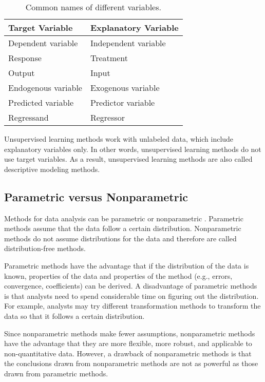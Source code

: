 \documentclass[12pt]{article}
\begin{document}
\begin{table}[htb]
\centering
\begin{tabular}{ll}
\toprule
\textbf{Target Variable}  &  \textbf{Explanatory Variable}\\
\midrule
Dependent variable & Independent variable\\
Response & Treatment \\
Output & Input \\
Endogenous variable & Exogenous variable \\
Predicted variable & Predictor variable \\
Regressand & Regressor \\
\bottomrule
\end{tabular}
\caption{Common names of different variables.}\label{tbl:lmnames}
\end{table}


Unsupervised learning methods work with unlabeled data, which include explanatory variables only. In other words, unsupervised learning methods do not use target variables. As a result, unsupervised learning methods are also called descriptive modeling methods.

\subsection{Parametric versus Nonparametric}

Methods for data analysis can be parametric or nonparametric \citep{abbott2014}. Parametric methods assume that the data follow a certain distribution. Nonparametric methods do not assume distributions for the data and therefore are called distribution-free methods.

Parametric methods have the advantage that if the distribution of the data is known, properties of the data and properties of the method (e.g., errors, convergence, coefficients) can be derived. A disadvantage of parametric methods is that analysts need to spend considerable time on figuring out the distribution. For example, analysts may try different transformation methods to transform the data so that it follows a certain distribution.

Since nonparametric methods make fewer assumptions, nonparametric methods have the advantage that they are more flexible, more robust, and applicable to non-quantitative data. However, a drawback of nonparametric methods is that the conclusions drawn from nonparametric methods are not as powerful as those drawn from parametric methods.  
\end{document}
